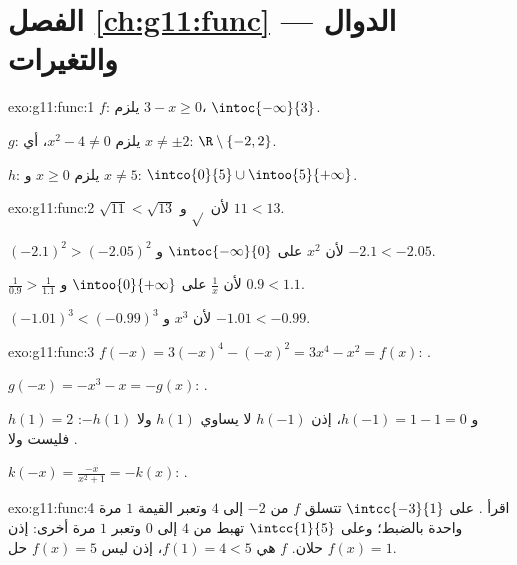 \section*{الفصل \ref{ch:g11:func} --- الدوال والتغيرات}

\begin{solution}{exo:g11:func:1}
$f$: يلزم $3 - x \geq 0$،  $\intoc{-\infty}{3}$.

$g$: يلزم $x^2 - 4 \neq 0$، أي $x \neq \pm 2$: 
$\R \setminus \{-2, 2\}$.

$h$: يلزم $x \geq 0$ و $x \neq 5$: 
$\intco{0}{5} \cup \intoo{5}{+\infty}$.
\end{solution}

\begin{solution}{exo:g11:func:2}
$\sqrt{11} < \sqrt{13}$ لأن $\sqrt{}$  و $11 < 13$.

$(-2.1)^2 > (-2.05)^2$ لأن $x^2$  على
$\intoc{-\infty}{0}$ و $-2.1 < -2.05$.

$\frac{1}{0.9} > \frac{1}{1.1}$ لأن $\frac1x$  على
$\intoo{0}{+\infty}$ و $0.9 < 1.1$.

$(-1.01)^3 < (-0.99)^3$ لأن $x^3$  و $-1.01 < -0.99$.
\end{solution}

\begin{solution}{exo:g11:func:3}
$f(-x) = 3(-x)^4 - (-x)^2 = 3x^4 - x^2 = f(x)$: .

$g(-x) = -x^3 - x = -g(x)$: .

$h(1) = 2$ و $h(-1) = 1 - 1 = 0$، إذن $h(-1)$ لا يساوي $h(1)$ ولا
$-h(1)$: فليست  ولا .

$k(-x) = \frac{-x}{x^2+1} = -k(x)$: .
\end{solution}

\begin{solution}{exo:g11:func:4}
اقرأ . على $\intcc{-3}{1}$ تتسلق $f$ من $-2$ إلى $4$
وتعبر القيمة $1$ مرة واحدة بالضبط؛ وعلى $\intcc{1}{5}$ تهبط
من $4$ إلى $0$ وتعبر $1$ مرة أخرى: إذن  $f(x) = 1$
حلان.   $f$ هي $f(1) = 4 < 5$، إذن ليس  $f(x) = 5$
حل.
\end{solution}


